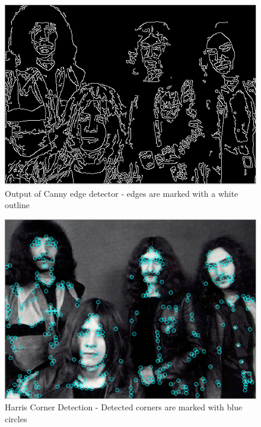 \documentclass[10pt,a4paper]{article}
\begin{document}
\begin{figure}[ht!]
\centering
\includegraphics{canny_edge.png}
\caption{Output of Canny edge detector - edges are marked with a white outline}
\label{fig:canny}
\end{figure}

\begin{figure}[ht!]
\centering
\includegraphics{harris_corner.png}
\caption{Harris Corner Detection - Detected corners are marked with blue circles}
\label{fig:harris}
\end{figure}
\end{document}

